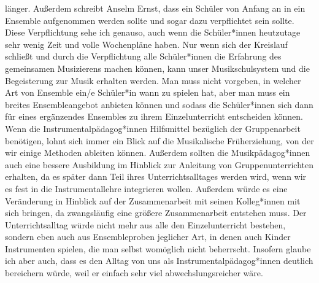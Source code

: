 länger.\autocite[33]{losert:die_kunst_zu_unterrichten} Außerdem schreibt Anselm
Ernst, dass ein Schüler von Anfang an in ein Ensemble aufgenommen werden sollte
und sogar dazu verpflichtet sein sollte.
\autocite[61]{ernst:die_zukunftsfaehige_musikschule} Diese Verpflichtung sehe
ich genauso, auch wenn die Schüler*innen heutzutage sehr wenig Zeit und volle
Wochenpläne haben. Nur wenn sich der Kreislauf schließt und durch die
Verpflichtung alle Schüler*innen die Erfahrung des gemeinsamen Musizierens
machen können, kann unser Musikschulsystem und die Begeisterung zur Musik
erhalten werden. Man muss nicht vorgeben, in welcher Art von Ensemble ein/e
Schüler*in wann zu spielen hat, aber man muss ein breites Ensembleangebot
anbieten können und sodass die Schüler*innen sich dann für eines ergänzendes
Ensembles zu ihrem Einzelunterricht entscheiden können. Wenn die
Instrumentalpädagog*innen Hilfsmittel bezüglich der Gruppenarbeit benötigen,
lohnt sich immer ein Blick auf die Musikalische Früherziehung, von der wir
einige Methoden ableiten können. Außerdem sollten die Musikpädagog*innen auch
eine bessere Ausbildung im Hinblick zur Anleitung von Gruppenunterrichten
erhalten, da es später dann Teil ihres Unterrichtsalltages werden wird, wenn wir
es fest in die Instrumentallehre integrieren wollen. Außerdem würde es eine
Veränderung in Hinblick auf der Zusammenarbeit mit seinen Kolleg*innen mit sich
bringen, da zwangsläufig eine größere Zusammenarbeit entstehen muss. Der
Unterrichtsalltag würde nicht mehr aus alle den Einzelunterricht bestehen,
sondern eben auch aus Ensembleproben jeglicher Art, in denen auch Kinder
Instrumenten spielen, die man selbst womöglich nicht beherrscht. Insofern glaube
ich aber auch, dass es den Alltag von uns als Instrumentalpädagog*innen deutlich
bereichern würde, weil er einfach sehr viel abwechslungsreicher wäre. 













